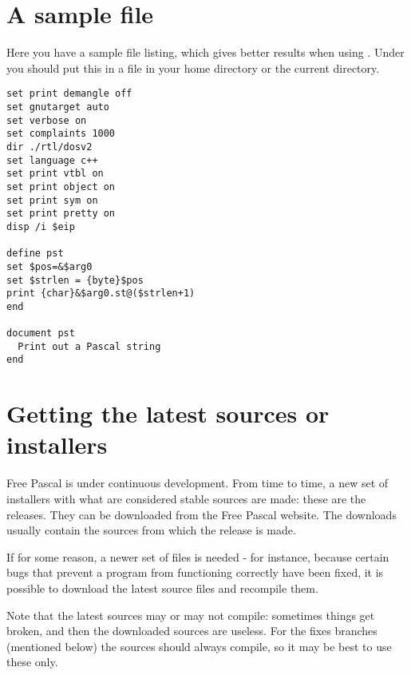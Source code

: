 

\chapter{A sample  file}
\label{ch:GdbIniFile}

Here you have a sample  file listing, which gives better
results when using . Under \linux you should put this in a
 file in your home directory or the current directory.

\begin{verbatim}
set print demangle off
set gnutarget auto
set verbose on
set complaints 1000
dir ./rtl/dosv2
set language c++
set print vtbl on
set print object on
set print sym on
set print pretty on
disp /i $eip

define pst
set $pos=&$arg0
set $strlen = {byte}$pos
print {char}&$arg0.st@($strlen+1)
end

document pst
  Print out a Pascal string
end
\end{verbatim}



\chapter{Getting the latest sources or installers}
\label{ch:sourcedownload}

Free Pascal is under continuous development. From time to time, a new
set of installers with what are considered stable sources are made: these
are the releases. They can be downloaded from the Free Pascal website.
The downloads usually contain the sources from which the release is made.

If for some reason, a newer set of files is needed - for instance, because
certain bugs that prevent a program from functioning correctly have been
fixed, it is possible to download the latest source files and recompile
them.

Note that the latest sources may or may not compile: sometimes things get
broken, and then the downloaded sources are useless. For the fixes branches
(mentioned below) the sources should always compile, so it may be best
to use these only.

